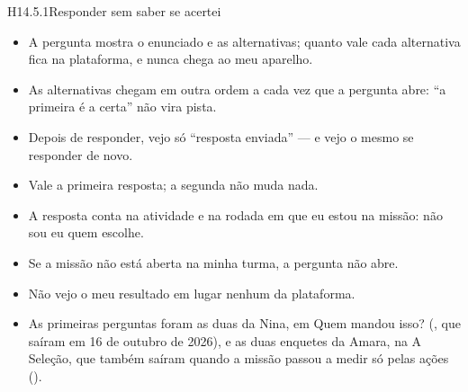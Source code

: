 
\begin{historia}{H14.5.1}{Responder sem saber se acertei}{\pronto}
\aceite
\begin{itemize}
  \item A pergunta mostra o enunciado e as alternativas; quanto vale cada
    alternativa fica na plataforma, e nunca chega ao meu aparelho.
  \item As alternativas chegam em outra ordem a cada vez que a pergunta abre:
    \enquote{a primeira é a certa} não vira pista.
  \item Depois de responder, vejo só \enquote{resposta enviada} --- e vejo o
    mesmo se responder de novo.
  \item Vale a primeira resposta; a segunda não muda nada.
  \item A resposta conta na atividade e na rodada em que eu estou na missão:
    não sou eu quem escolhe.
  \item Se a missão não está aberta na minha turma, a pergunta não abre.
  \item Não vejo o meu resultado em lugar nenhum da plataforma.
  \item As primeiras perguntas foram as duas da Nina, em Quem mandou isso?
    (, que saíram em 16 de outubro de 2026), e as duas enquetes
    da Amara, na A Seleção, que também saíram quando a missão passou a medir
    só pelas ações ().
\end{itemize}
\end{historia}


